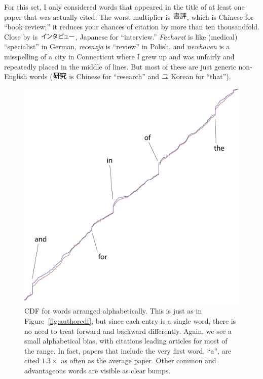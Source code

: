 \documentclass[twocolumn]{article}
\begin{document}
For this set, I only considered words that appeared in the title of at
least one paper that was actually cited. The worst multiplier is
\includegraphics[width=2em]{bookreview}, which is Chinese for ``book
review;'' it reduces your chances of citation by more than ten
thousandfold. Close by is \includegraphics[width=5em]{interview},
Japanese for ``interview.'' {\em Facharzt} is like (medical)
``specialist'' in German, {\em recenzja} is ``review'' in Polish, and
{\em newhaven} is a misspelling of a city in Connecticut where I grew
up and was unfairly and repeatedly placed in the middle of lines. But
most of these are just generic non-English words
(\includegraphics[width=2em]{research} is Chinese for ``research'' and
\includegraphics[width=1em]{that} Korean for ``that'').

\begin{figure}
  \begin{center}
  \includegraphics[width=0.475 \textwidth]{wordstats}
  \end{center}
  \caption{ CDF for words arranged alphabetically. This is just as
    in Figure~\ref{fig:authorcdf}, but since each entry is a single
    word, there is no need to treat forward and backward differently.
    Again, we see a small alphabetical bias, with citations leading
    articles for most of the range. In fact, papers that include the
    very first word, ``a'', are cited $1.3\times$ as often as the
    average paper. Other common and advantageous words are visible
    as clear bumps.
  } \label{fig:wordcdf}
\end{figure}
\end{document}
